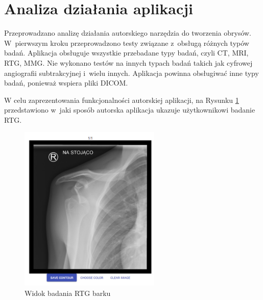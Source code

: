 \documentclass[a4paper,11pt,twoside,openright]{report}
\theoremstyle{definition}
\begin{document}



\section {Analiza działania aplikacji}



Przeprowadzano analizę działania autorskiego narzędzia do tworzenia obrysów.
W~pierwszym kroku przeprowadzono testy związane z~obsługą różnych typów badań.
Aplikacja obsługuje wszystkie przebadane typy badań, czyli CT, MRI, RTG, MMG.
Nie wykonano testów na innych typach badań takich jak cyfrowej angiografii subtrakcyjnej
i~wielu innych. Aplikacja powinna obsługiwać inne typy badań, ponieważ wspiera pliki DICOM.

W celu zaprezentowania funkcjonalności autorskiej aplikacji, na Rysunku \ref{fig:113} 
przedstawiono w~jaki sposób autorska aplikacja ukazuje 
użytkownikowi badanie RTG. 

\begin{figure}[h!]
	\center
	\includegraphics[width=0.6\textwidth]{113}
	\caption{Widok badania RTG barku}
    	\label{fig:113}
\end{figure}
\end{document}
